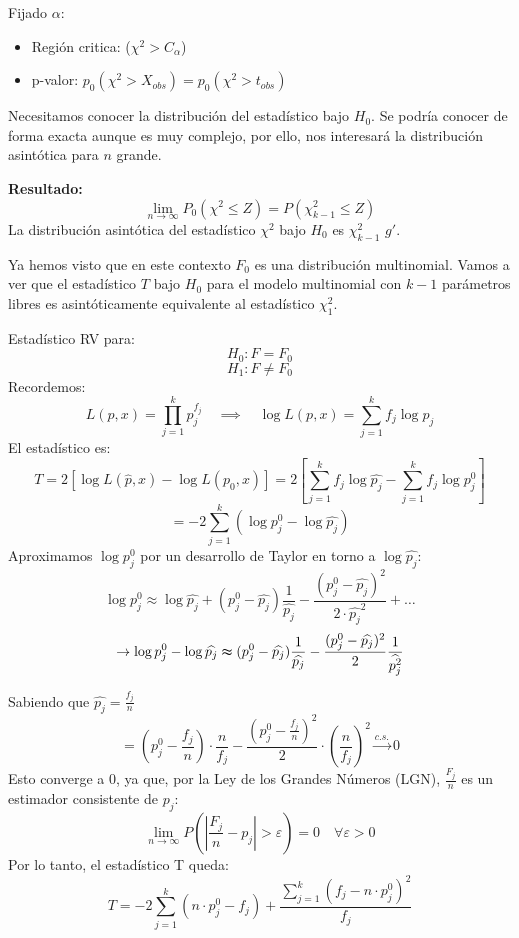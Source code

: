 \vspace{5mm}

\noindent Fijado $\alpha$:
\begin{itemize}
    \item Región critica: ($\chi^2 > C_\alpha$)
    \item p-valor: $p_0(\chi^2>X_{obs})=p_0(\chi^2>t_{obs})$
\end{itemize}

Necesitamos conocer la distribución del estadístico bajo $H_0$.
Se podría conocer de forma exacta aunque es muy complejo, por ello, nos interesará la distribución asintótica para $n$ grande.

\smallskip

\noindent \textbf{Resultado:}
\[
    \lim_{n \to \infty} P_0(\chi^2 \leq Z)=P(\chi^2_{k-1} \leq Z)
\]
La distribución asintótica del estadístico $\chi^2$ bajo $H_0$ es $\chi^2_{k-1}$ $g'$.

Ya hemos visto que en este contexto $ F_0 $ es una distribución multinomial. 
Vamos a ver que el estadístico $ T $ bajo $ H_0 $ para el modelo multinomial con $ k-1 $ parámetros libres es asintóticamente equivalente al estadístico $ \chi^2_1 $.

\begin{proofs}
    Estadístico RV para:
    \[
        H_0: F = F_0
    \]
    \[
        H_1: F \neq F_0
    \]
    Recordemos:
    \[
        L(p, x) = \prod_{j=1}^{k} p_j^{f_j} \quad \implies \quad \log L(p, x) = \sum_{j=1}^{k} f_j \log p_j
    \]
    El estadístico es:
    \[
        T = 2 \left[\log L(\widehat{p}, x) - \log L(p_0, x)\right] = 2 \left[ \sum_{j=1}^{k} f_j \log \widehat{p_j} - \sum_{j=1}^{k} f_j \log p_j^0 \right] 
    \]
    \[
        = -2 \sum_{j=1}^{k} \left( \log p_j^0 - \log \widehat{p_j} \right)
    \]
    Aproximamos $\log p_j^0$ por un desarrollo de Taylor en torno a $\log \widehat{p_j}$:
    \[
        \log p_j^0 \approx \log \widehat{p_j} + (p_j^0 - \widehat{p_j}) \frac{1}{\widehat{p_j}} - \frac{(p_j^0 - \widehat{p_j})^2}{2 \cdot \widehat{p_j}^2}+ \dots
    \]
    \[
        \to \log p_j^0- \log \widehat{p_j}\thickapprox (p^0_j-\widehat{p_j}) \frac{1}{\widehat{p_j}}- \frac{(p^0_j-\widehat{p_j})^2}{2}\frac{1}{\widehat{p_j^2}}
    \]
\end{proofs}

\newpage

\begin{proofs*}
    Sabiendo que $\widehat{p_j}=\frac{f_j}{n}$
    \[
        =\left(p_j^0-\frac{f_j}{n}\right) \cdot \frac{n}{f_j} - \frac{\left(p_j^0-\frac{f_j}{n}\right)^2}{2}\cdot \left(\frac{n}{f_j}\right)^2 \xrightarrow{c.s.} 0
    \]
    Esto converge a 0, ya que, por la Ley de los Grandes Números (LGN), $\frac{F_j}{n}$ es un estimador consistente de $p_j$:
    \[
        \lim_{n \to \infty} P \left( \left| \frac{F_j}{n} - p_j \right| > \varepsilon \right) = 0 \quad \forall \varepsilon>0
    \]
    Por lo tanto, el estadístico T queda:
    \[
        T = -2 \sum_{j=1}^{k} \left( n \cdot p_j^0 - f_j \right) + \frac{\sum_{j=1}^{k} (f_j - n \cdot p_j^0)^2}{f_j}
    \]
\end{proofs*}

